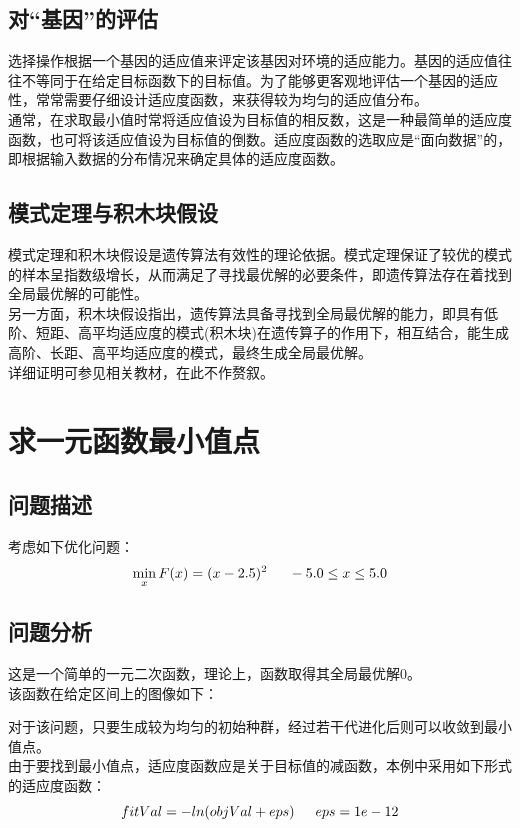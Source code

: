 \documentclass[UTF8]{ctexart}
\begin{document}
\subsection{对“基因”的评估}
选择操作根据一个基因的适应值来评定该基因对环境的适应能力。基因的适应值往往不等同于在给定目标函数下的目标值。为了能够更客观地评估一个基因的适应性，常常需要仔细设计适应度函数，来获得较为均匀的适应值分布。\\
\indent 通常，在求取最小值时常将适应值设为目标值的相反数，这是一种最简单的适应度函数，也可将该适应值设为目标值的倒数。适应度函数的选取应是“面向数据”的，即根据输入数据的分布情况来确定具体的适应度函数。

\subsection{模式定理与积木块假设}
模式定理和积木块假设是遗传算法有效性的理论依据。模式定理保证了较优的模式的样本呈指数级增长，从而满足了寻找最优解的必要条件，即遗传算法存在着找到全局最优解的可能性。\\
\indent 另一方面，积木块假设指出，遗传算法具备寻找到全局最优解的能力，即具有低阶、短距、高平均适应度的模式(积木块)在遗传算子的作用下，相互结合，能生成高阶、长距、高平均适应度的模式，最终生成全局最优解。\\
\indent 详细证明可参见相关教材，在此不作赘叙。

\section{求一元函数最小值点}

\subsection{问题描述}
考虑如下优化问题：
\[
	\min_x F(x) = (x-2.5)^2 \indent -5.0 \leq x \leq 5.0 
\]

\subsection{问题分析}
这是一个简单的一元二次函数，理论上，函数取得其全局最优解0。\\
\indent 该函数在给定区间上的图像如下：

\indent 对于该问题，只要生成较为均匀的初始种群，经过若干代进化后则可以收敛到最小值点。\\
\indent 由于要找到最小值点，适应度函数应是关于目标值的减函数，本例中采用如下形式的适应度函数：
\[
	fitVal=-ln(objVal+eps) \indent eps=1e-12
\]
\end{document}
